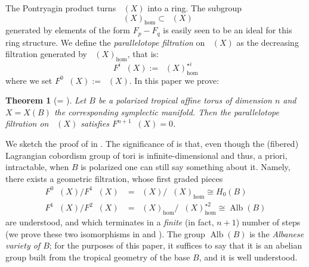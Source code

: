 \documentclass[10pt]{amsart}
\newcounter{mainthm}
\newtheorem{mainthm}[mainthm]{Theorem}
\theoremstyle{definition}
\theoremstyle{remark}
\DeclareMathOperator{\Alb}{Alb}
\DeclareMathOperator{\Cobfib}{\mathrm{Cob}_{\mathrm{fib}}}
\begin{document}
The Pontryagin product turns $\Cobfib(X)$ into a ring.
The subgroup 
$$
\Cobfib(X)_{\hom} \subset \Cobfib(X)
$$
generated by elements of the form $F_p - F_q$ is easily seen to be an ideal for this ring structure.
We define the \emph{parallelotope filtration} on $\Cobfib(X)$ as the decreasing filtration generated by $\Cobfib(X)_{\hom}$, that is:
$$
    F^i\Cobfib(X) := \Cobfib(X)_{\hom}^{\star i}
$$
where we set $F^0\Cobfib(X) := \Cobfib(X)$.
In this paper we prove:
\begin{mainthm}[= ]\label{mainthm:filtration_terminates}
    Let $B$ be a polarized tropical affine torus of dimension $n$ and $X = X(B)$ the corresponding symplectic manifold.
    Then the parallelotope filtration on $\Cobfib(X)$ satisfies $F^{n+1}\Cobfib(X) = 0$.
\end{mainthm}

We sketch the proof of  in .
The significance of  is that, even though the (fibered) Lagrangian cobordism group of tori is infinite-dimensional \cite{sheridan2020rational,muniz2024lagrangian} and thus, a priori, intractable, when $B$ is polarized one can still say something about it.
Namely, there exists a geometric filtration, whose first graded pieces 
\begin{align*}
    F^0 \Cobfib(X)/F^1 \Cobfib(X) &=  \Cobfib(X) / \Cobfib(X)_{\hom} \cong H_0(B)\\
    F^1 \Cobfib(X)/F^2 \Cobfib(X) &=  \Cobfib(X)_{\hom} / \Cobfib(X)_{\hom}^{\star 2} \cong \Alb(B)
\end{align*}
are understood, and which terminates in a \emph{finite} (in fact, $n+1$) number of steps (we prove these two isomorphisms in  and ).
The group $\Alb(B)$ is the \emph{Albanese variety of $B$}; for the purposes of this paper, it suffices to say that it is an abelian group built from the tropical geometry of the base $B$, and it is well understood.
\end{document}

